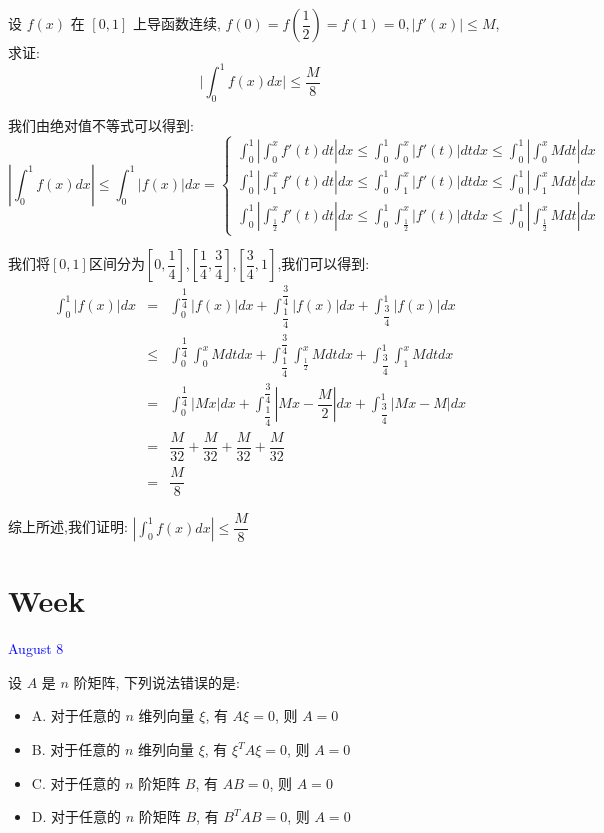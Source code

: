 \begin{example}[][Exam: 34.1.14]
	设 $f(x)$ 在 $[0,1]$ 上导函数连续, $f(0)=f(\dfrac{1}{2})=f(1)=0, \big|f'(x)\big|\leq M$, 求证: 
	$$\big|\int_{0}^{1}f(x)dx\big|\leq \dfrac{M}{8}$$
\end{example}

\begin{solution}

	我们由绝对值不等式可以得到:  
	$$|\int_{0}^{1}f(x)dx|\leq \int_{0}^{1}|f(x)|dx=\left\lbrace
	\begin{array}{l}
		\int_{0}^{1}|\int_{0}^{x}f'(t)dt|dx\leq \int_{0}^{1}\int_{0}^{x}|f'(t)|dtdx\leq \int_{0}^{1}|\int_{0}^{x}Mdt|dx\\
		\int_{0}^{1}|\int_{1}^{x}f'(t)dt|dx\leq \int_{0}^{1}\int_{1}^{x}|f'(t)|dtdx\leq \int_{0}^{1}|\int_{1}^{x}Mdt|dx\\
		\int_{0}^{1}|\int_{\frac{1}{2}}^{x}f'(t)dt|dx\leq \int_{0}^{1}\int_{\frac{1}{2}}^{x}|f'(t)|dtdx\leq \int_{0}^{1}|\int_{\frac{1}{2}}^{x}Mdt|dx
	\end{array}
	\right. $$
	
	我们将$[0,1]$区间分为$[0,\dfrac{1}{4}]$,$[\dfrac{1}{4},\dfrac{3}{4}]$,$[\dfrac{3}{4},1]$,我们可以得到:  
	\begin{eqnarray*}
		\int_{0}^{1}|f(x)|dx&=&\int_{0}^{\dfrac{1}{4}}|f(x)|dx+\int_{\dfrac{1}{4}}^{\dfrac{3}{4}}|f(x)|dx+\int_{\dfrac{3}{4}}^{1}|f(x)|dx\\
		&\leq&\int_{0}^{\dfrac{1}{4}}\int_{0}^{x}Mdtdx+\int_{\dfrac{1}{4}}^{\dfrac{3}{4}}\int_{\frac{1}{2}}^{x}Mdtdx+\int_{\dfrac{3}{4}}^{1}\int_{1}^{x}Mdtdx\\
		&=&\int_{0}^{\dfrac{1}{4}}|Mx|dx+\int_{\dfrac{1}{4}}^{\dfrac{3}{4}}|Mx-\dfrac{M}{2}|dx+\int_{\dfrac{3}{4}}^{1}|Mx-M|dx\\
		&=&\dfrac{M}{32}+\dfrac{M}{32}+\dfrac{M}{32}+\dfrac{M}{32}\\
		&=&\dfrac{M}{8}
	\end{eqnarray*}

	综上所述,我们证明:  $|\int_{0}^{1}f(x)dx|\leq \dfrac{M}{8}$
\end{solution}


\section{Week }
\textcolor{blue}{August 8}

\begin{example}[][Exam: 34.2.1]
	设 $A$ 是 $n$ 阶矩阵, 下列说法错误的是:  
\begin{itemize}
	\item A. 对于任意的 $n$ 维列向量 $\xi$, 有 $A\xi=0$, 则 $A=0$
	\item B. 对于任意的 $n$ 维列向量 $\xi$, 有 $\xi^{T}A\xi=0$, 则 $A=0$
	\item C. 对于任意的 $n$ 阶矩阵 $B$, 有 $AB=0$, 则 $A=0$
	\item D. 对于任意的 $n$ 阶矩阵 $B$, 有 $B^{T}AB=0$, 则 $A=0$
\end{itemize}
\end{example}

